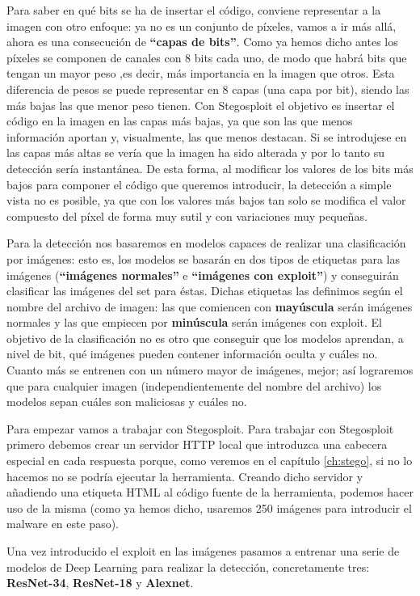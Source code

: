 Para saber en qué bits se ha de insertar el código, conviene representar a la imagen con otro enfoque: ya no es un conjunto de píxeles, vamos a ir más allá, ahora es una consecución de \textbf{``capas de bits''}. Como ya hemos dicho antes los píxeles se componen de canales con 8 bits cada uno, de modo que habrá bits que tengan un mayor peso ,es decir, más importancia en la imagen que otros. Esta diferencia de pesos se puede representar en 8 capas (una capa por bit), siendo las más bajas las que menor peso tienen. Con Stegosploit el objetivo es insertar el código en la imagen en las capas más bajas, ya que son las que menos información aportan y, visualmente, las que menos destacan. Si se introdujese en las capas más altas se vería que la imagen ha sido alterada y por lo tanto su detección sería instantánea. De esta forma, al modificar los valores de los bits más bajos para componer el código que queremos introducir, la detección a simple vista no es posible, ya que con los valores más bajos tan solo se modifica el valor compuesto del píxel de forma muy sutil y con variaciones muy pequeñas.

Para la detección nos basaremos en modelos capaces de realizar una clasificación por imágenes: esto es, los modelos se basarán en dos tipos de etiquetas para las imágenes (\textbf{``imágenes normales''} e \textbf{``imágenes con exploit''}) y conseguirán clasificar las imágenes del set para éstas. Dichas etiquetas las definimos según el nombre del archivo de imagen: las que comiencen con \textbf{mayúscula} serán imágenes normales y las que empiecen por \textbf{minúscula} serán imágenes con exploit. El objetivo de la clasificación no es otro que conseguir que los modelos aprendan, a nivel de bit, qué imágenes pueden contener información oculta y cuáles no. Cuanto más se entrenen con un número mayor de imágenes, mejor; así lograremos que para cualquier imagen (independientemente del nombre del archivo) los modelos sepan cuáles son maliciosas y cuáles no.

Para empezar vamos a trabajar con Stegosploit. Para trabajar con Stegosploit primero debemos crear un servidor HTTP local que introduzca una cabecera especial en cada respuesta porque, como veremos en el capítulo \ref{ch:stego}, si no lo hacemos no se podría ejecutar la herramienta. Creando dicho servidor y añadiendo una etiqueta HTML al código fuente de la herramienta, podemos hacer uso de la misma (como ya hemos dicho, usaremos 250 imágenes para introducir el malware en este paso).

Una vez introducido el exploit en las imágenes pasamos a entrenar una serie de modelos de Deep Learning para realizar la detección, concretamente tres: \textbf{ResNet-34}, \textbf{ResNet-18} y \textbf{Alexnet}.

